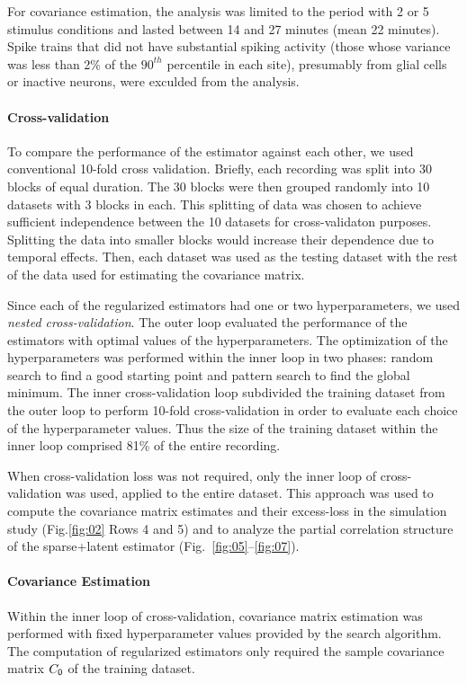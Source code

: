 \documentclass[10pt]{article}
\newcommand{\figref}[2]{Fig.\;\ref{fig:#1}\,#2}
\begin{document}
For covariance estimation, the analysis was limited to the period with 2 or 5 stimulus conditions and lasted between 14 and 27 minutes (mean 22 minutes).  Spike trains that did not have substantial spiking activity (those whose variance was less than 2\% of the $90^{th}$ percentile in each site), presumably from glial cells or inactive neurons, were exculded from the analysis.

\paragraph{Cross-validation}
To compare the performance of the estimator against each other, we used conventional 10-fold cross validation. Briefly, each recording was split into 30 blocks of equal duration.  The 30 blocks were then grouped randomly into 10 datasets with 3 blocks in each.  This splitting of data was chosen to achieve sufficient independence between the 10 datasets for cross-validaton purposes. Splitting the data into smaller blocks would increase their dependence due to temporal effects. Then, each dataset was used as the testing dataset with the rest of the data used for estimating the covariance matrix.  

Since each of the regularized estimators had one or two hyperparameters, we used \emph{nested cross-validation}.  The outer loop evaluated the performance of the estimators with optimal values of the hyperparameters.  The optimization of the hyperparameters was performed within the inner loop in two phases: random search to find a good starting point and pattern search to find the global minimum.  The inner cross-validation loop subdivided the training dataset from the outer loop to perform 10-fold cross-validation in order to evaluate each choice of the hyperparameter values.  Thus the size of the training dataset within the inner loop comprised 81\% of the entire recording.

When cross-validation loss was not required, only the inner loop of cross-validation was used, applied to the entire dataset.  This approach was used to compute the covariance matrix estimates and their excess-loss in the simulation study (\figref{02}{\,Rows 4 and 5}) and to analyze the partial correlation structure of the sparse+latent estimator (Fig.~\ref{fig:05}--\ref{fig:07}).
\paragraph{Covariance Estimation}
Within the inner loop of cross-validation, covariance matrix estimation was performed with fixed hyperparameter values provided by the search algorithm.  The computation of regularized estimators only required the sample covariance matrix $C_{\sf 0}$ of the training dataset. 
\end{document}
